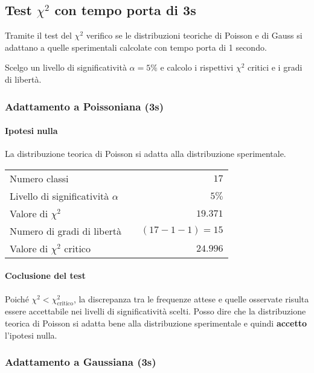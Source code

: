 \documentclass{article}
\begin{document}
\subsection{Test \(\chi^2\) con tempo porta di 3s}
Tramite il test del \(\chi^2\) verifico se le distribuzioni teoriche di Poisson e di Gauss si adattano a quelle sperimentali calcolate con tempo porta di 1 secondo.

Scelgo un livello di significatività $\alpha = 5\%$ e calcolo i rispettivi $\chi^2$ critici e i gradi di libertà.


\subsubsection{Adattamento a Poissoniana (3s)}
\paragraph{Ipotesi nulla} La distribuzione teorica di Poisson si adatta alla distribuzione sperimentale.

\vspace{0.2cm}
\begin{center}
\begin{tabular}{lr}
	Numero classi & $17$ \\
	Livello di significatività $\alpha$		& $ \quad 5\%$  \\
	Valore di $\chi ^2$             	& $\quad 19.371$       \\
	Numero di gradi di libertà      	& $\quad (17-1-1) = 15$         \\   
	Valore di $\chi ^2$ critico     	& $\quad 24.996$
\end{tabular}
\end{center}

\paragraph{Coclusione del test} Poiché $\chi^2 < \chi^2_{\text{critico}}$, la discrepanza tra le frequenze attese e quelle osservate risulta essere accettabile nei livelli di significatività scelti. Posso dire che la distribuzione teorica di Poisson si adatta bene alla distribuzione sperimentale e quindi \textbf{accetto} l'ipotesi nulla.


\subsubsection{Adattamento a Gaussiana (3s)}
\end{document}
